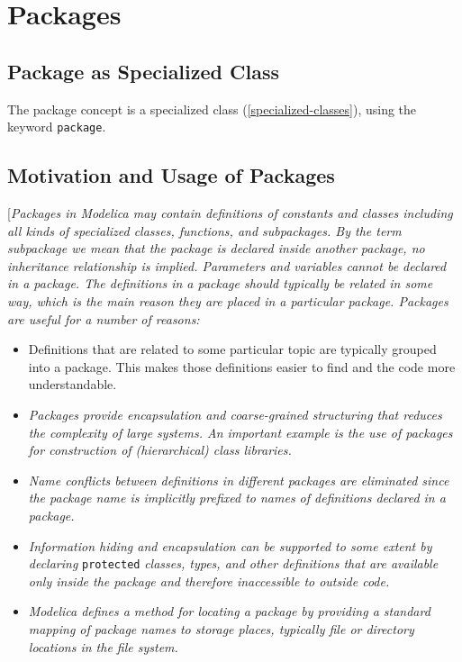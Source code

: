 \chapter{Packages}

\section{Package as Specialized Class}

The package concept is a specialized class (\autoref{specialized-classes}), using the
keyword \lstinline!package!.

\section{Motivation and Usage of Packages}

{[}\emph{Packages in Modelica may contain definitions of constants and
classes including all kinds of specialized classes, functions, and
subpackages. By the term subpackage we mean that the package is declared
inside another package, no inheritance relationship is implied.
Parameters and variables cannot be declared in a package. The
definitions in a package should typically be related in some way, which
is the main reason they are placed in a particular package. Packages are
useful for a number of reasons:}

\begin{itemize}
\item
  Definitions that are related to some particular topic are typically
  grouped into a package. This makes those definitions easier to find
  and the code more understandable.
\item
  \emph{Packages provide encapsulation and coarse-grained structuring
  that reduces the complexity of large systems. An important example is
  the use of packages for construction of (hierarchical) class
  libraries.}
\item
  \emph{Name conflicts between definitions in different packages are
  eliminated since the package name is implicitly prefixed to names of
  definitions declared in a package.}
\item
  \emph{Information hiding and encapsulation can be supported to some
  extent by declaring} \lstinline!protected! \emph{classes, types, and other
  definitions that are available only inside the package and therefore
  inaccessible to outside code.}
\item
  \emph{Modelica defines a method for locating a package by providing a
  standard mapping of package names to storage places, typically file or
  directory locations in the file system. }
\end{itemize}

